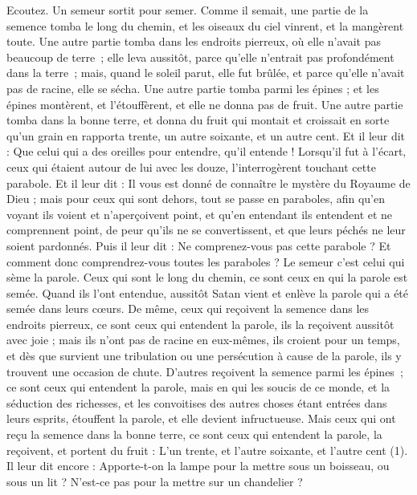 \begin{multicols}{2}
Ecoutez. Un semeur sortit pour semer.
Comme il semait, une partie de la semence tomba le long du chemin, et les oiseaux du ciel vinrent, et la mangèrent toute.
Une autre partie tomba dans les endroits pierreux, où elle n'avait pas beaucoup de terre ; elle leva aussitôt, parce qu'elle n'entrait pas profondément dans la terre ;
mais, quand le soleil parut, elle fut brûlée, et parce qu'elle n'avait pas de racine, elle se sécha.
Une autre partie tomba parmi les épines ; et les épines montèrent, et l'étouffèrent, et elle ne donna pas de fruit.
Une autre partie tomba dans la bonne terre, et donna du fruit qui montait et croissait en sorte qu'un grain en rapporta trente, un autre soixante, et un autre cent.
Et il leur dit : Que celui qui a des oreilles pour entendre, qu'il entende !
Lorsqu’il fut à l’écart, ceux qui étaient autour de lui avec les douze, l'interrogèrent touchant cette parabole.
Et il leur dit : Il vous est donné de connaître le mystère du Royaume de Dieu ; mais pour ceux qui sont dehors, tout se passe en paraboles,
afin qu'en voyant ils voient et n'aperçoivent point, et qu'en entendant ils entendent et ne comprennent point, de peur qu'ils ne se convertissent, et que leurs péchés ne leur soient pardonnés.
Puis il leur dit : Ne comprenez-vous pas cette parabole ? Et comment donc comprendrez-vous toutes les paraboles ?
Le semeur c'est celui qui sème la parole.
Ceux qui sont le long du chemin, ce sont ceux en qui la parole est semée. Quand ils l’ont entendue, aussitôt Satan vient et enlève la parole qui a été semée dans leurs cœurs.
De même, ceux qui reçoivent la semence dans les endroits pierreux, ce sont ceux qui entendent la parole, ils la reçoivent aussitôt avec joie ;
mais ils n'ont pas de racine en eux-mêmes, ils croient pour un temps, et dès que survient une tribulation ou une persécution à cause de la parole, ils y trouvent une occasion de chute.
D’autres reçoivent la semence parmi les épines ; ce sont ceux qui entendent la parole,
mais en qui les soucis de ce monde, et la séduction des richesses, et les convoitises des autres choses étant entrées dans leurs esprits, étouffent la parole, et elle devient infructueuse.
Mais ceux qui ont reçu la semence dans la bonne terre, ce sont ceux qui entendent la parole, la reçoivent, et portent du fruit : L'un trente, et l'autre soixante, et l'autre cent (1).
Il leur dit encore : Apporte-t-on la lampe pour la mettre sous un boisseau, ou sous un lit ? N'est-ce pas pour la mettre sur un chandelier ?

\end{multicols}
